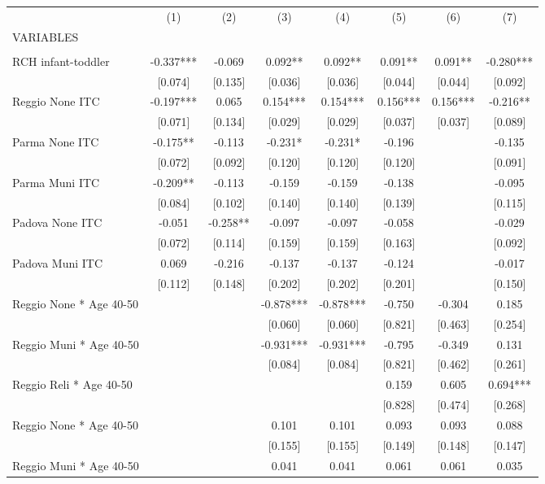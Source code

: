 \begin{tabular}{lccccccc} \hline
 & (1) & (2) & (3) & (4) & (5) & (6) & (7) \\
VARIABLES &  &  &  &  &  &  &  \\ \hline
 &  &  &  &  &  &  &  \\
RCH infant-toddler & -0.337*** & -0.069 & 0.092** & 0.092** & 0.091** & 0.091** & -0.280*** \\
 & [0.074] & [0.135] & [0.036] & [0.036] & [0.044] & [0.044] & [0.092] \\
Reggio None ITC & -0.197*** & 0.065 & 0.154*** & 0.154*** & 0.156*** & 0.156*** & -0.216** \\
 & [0.071] & [0.134] & [0.029] & [0.029] & [0.037] & [0.037] & [0.089] \\
Parma None ITC & -0.175** & -0.113 & -0.231* & -0.231* & -0.196 &  & -0.135 \\
 & [0.072] & [0.092] & [0.120] & [0.120] & [0.120] &  & [0.091] \\
Parma Muni ITC & -0.209** & -0.113 & -0.159 & -0.159 & -0.138 &  & -0.095 \\
 & [0.084] & [0.102] & [0.140] & [0.140] & [0.139] &  & [0.115] \\
Padova None ITC & -0.051 & -0.258** & -0.097 & -0.097 & -0.058 &  & -0.029 \\
 & [0.072] & [0.114] & [0.159] & [0.159] & [0.163] &  & [0.092] \\
Padova Muni ITC & 0.069 & -0.216 & -0.137 & -0.137 & -0.124 &  & -0.017 \\
 & [0.112] & [0.148] & [0.202] & [0.202] & [0.201] &  & [0.150] \\
Reggio None * Age 40-50 &  &  & -0.878*** & -0.878*** & -0.750 & -0.304 & 0.185 \\
 &  &  & [0.060] & [0.060] & [0.821] & [0.463] & [0.254] \\
Reggio Muni * Age 40-50 &  &  & -0.931*** & -0.931*** & -0.795 & -0.349 & 0.131 \\
 &  &  & [0.084] & [0.084] & [0.821] & [0.462] & [0.261] \\
Reggio Reli * Age 40-50 &  &  &  &  & 0.159 & 0.605 & 0.694*** \\
 &  &  &  &  & [0.828] & [0.474] & [0.268] \\
Reggio None * Age 40-50 &  &  & 0.101 & 0.101 & 0.093 & 0.093 & 0.088 \\
 &  &  & [0.155] & [0.155] & [0.149] & [0.148] & [0.147] \\
Reggio Muni * Age 40-50 &  &  & 0.041 & 0.041 & 0.061 & 0.061 & 0.035 \\

\end{tabular}
